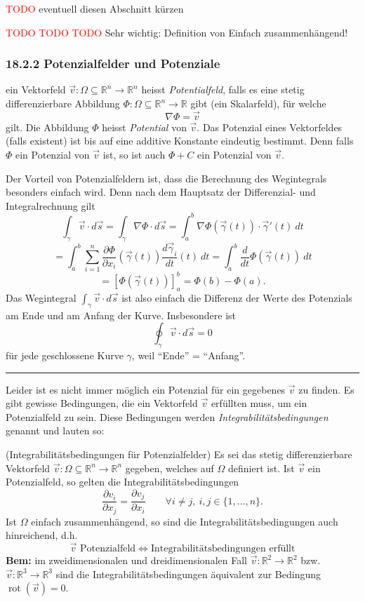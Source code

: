 \documentclass[a4paper,landscape,8pt]{extarticle}
\newcommand{\R}{\mathbb{R}}
\newcommand{\todo}{\textcolor{red}{TODO }}
\newcommand{\sep}{\vspace{5pt}\noindent\hrule\vspace{5pt}}
\newcommand{\Bem}{\textbf{Bem: }}
\DeclareMathOperator{\rot}{rot}
\begin{document}
\begin{multicols*}{4}
\begin{warmup}
\todo eventuell diesen Abschnitt kürzen

\todo \todo \todo Sehr wichtig: Definition von Einfach zusammenhängend!
\end{warmup}

\subsubsection{18.2.2 Potenzialfelder und Potenziale}

\Def ein Vektorfeld $\vec{v}\colon\Omega\subseteq\R^n\to\R^n$ heisst
\emph{Potentialfeld}, falls es eine stetig differenzierbare Abbildung
$\Phi\colon\Omega\subseteq\R^n\to\R$ gibt (ein Skalarfeld), für welche
\[
\nabla\Phi=\vec{v}
\]
gilt. Die Abbildung $\Phi$ heisst \emph{Potential} von $\vec{v}$. Das Potenzial
eines Vektorfeldes (falls existent) ist bis auf eine additive Konstante
eindeutig bestimmt. Denn falls $\Phi$ ein Potenzial von $\vec{v}$ ist, so ist
auch $\Phi+C$ ein Potenzial von $\vec{v}$.

\begin{warmup}
Der Vorteil von Potenzialfeldern ist, dass die Berechnung des Wegintegrals
besonders einfach wird. Denn nach dem Hauptsatz der Differenzial- und
Integralrechnung gilt
\[
\int_\gamma \vec{v} \cdot d\vec{s} =
\int_\gamma \nabla\Phi \cdot d\vec{s} =
\int_a^b \nabla\Phi(\vec{\gamma}(t)) \cdot \vec{\gamma}'(t) \ dt 
\]
\[
=\int_a^b \sum_{i=1}^{n} \frac{\partial\Phi}{\partial x_i}(\vec{\gamma}(t))
\frac{d\vec{\gamma}_i}{dt}(t) \ dt
=\int_a^b \frac{d}{dt}\Phi(\vec{\gamma}(t)) \ dt
\]
\[
=\left[\Phi(\vec{\gamma}(t))\right]_a^b
=\Phi(b) - \Phi(a).
\]
Das Wegintegral $\int_\gamma\vec{v} \cdot d\vec{s}$ ist also einfach die
Differenz der Werte des Potenzials am Ende und am Anfang der Kurve. Insbesondere
ist
\[
\oint_\gamma\vec{v}\cdot d\vec{s} = 0
\]
für jede geschlossene Kurve $\gamma$, weil ``Ende'' = ``Anfang''.

\end{warmup}

\sep

Leider ist es nicht immer möglich ein Potenzial für ein gegebenes $\vec{v}$ zu
finden. Es gibt gewisse Bedingungen, die ein Vektorfeld $\vec{v}$ erfüllten
muss, um ein Potenzialfeld zu sein. Diese Bedingungen werden
\emph{Integrabilitätsbedingungen} genannt und lauten so:

\Satz (Integrabilitätsbedingungen für Potenzialfelder) Es sei das stetig
differenzierbare Vektorfeld $\vec{v}\colon\Omega\subseteq\R^n\to\R^n$ gegeben,
welches auf $\Omega$ definiert ist. Ist $\vec{v}$ ein Potenzialfeld, so gelten
die Integrabilitätsbedingungen
\[
\frac{\partial v_i}{\partial x_j} = \frac{\partial v_j}{\partial x_i} \qquad
\forall i\neq j, \ i,j\in\{1,\ldots,n\}.
\]
Ist $\Omega$ einfach zusammenhängend, so sind die Integrabilitätsbedingungen
auch hinreichend, d.h.
\[
\vec{v} \text{ Potenzialfeld} \Longleftrightarrow \text{
Integrabilitätsbedingungen erfüllt}
\]
\Bem im zweidimensionalen und dreidimensionalen Fall
$\vec{v}\colon\R^2\to\R^2$ bzw. $\vec{v}\colon\R^3\to\R^3$ sind die
Integrabilitätsbedingungen äquivalent zur Bedingung $\rot(\vec{v})=0$.


\end{multicols*}
\end{document}
